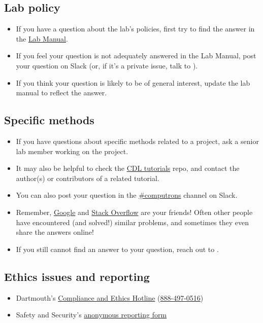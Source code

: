 \documentclass{tufte-book} %
\begin{document}
\subsection{Lab policy}
\begin{itemize}
\item If you have a question about the lab's policies, first try to
  find the answer in the
  \href{https://github.com/ContextLab/lab-manual/tree/master/lab_manual.pdf}{Lab
    Manual}.

\item If you feel your question is not adequately answered in the Lab
  Manual, post your question on Slack (or, if it's a private issue,
  talk to \director).

\item If you think your question is likely to be of general interest,
  update the lab manual to reflect the answer.
\end{itemize}

\subsection{Specific methods}
\begin{itemize}
\item If you have questions about specific methods related to a
  project, ask a senior lab member working on the project.

\item It may also be helpful to check the
  \href{https://github.com/contextLab/cdl-tutorials}{CDL tutorials}
  repo, and contact the author(s) or contributors of a related
  tutorial.

\item You can also post your question in the
  \href{https://context-lab.slack.com/messages/computrons/}{\#computrons}
  channel on Slack.

\item Remember, \href{https://www.google.com/}{Google} and
  \href{https://stackoverflow.com/}{Stack Overflow} are your friends!
  Often other people have encountered (and solved!) similar problems,
  and sometimes they even share the answers online!

\item If you still cannot find an answer to your question, reach out to \director.
\end{itemize}

\subsection{Ethics issues and reporting}
\begin{itemize}

\item Dartmouth's
  \href{https://www.dartmouth.ethicspoint.com}{Compliance and Ethics
    Hotline} (\href{tel:18884970516}{888-497-0516})
\item Safety and Security's
  \href{https://www.dartmouth.edu/~security/services/forms/anonreport.html}{anonymous
    reporting form}

\end{itemize}
\end{document}
